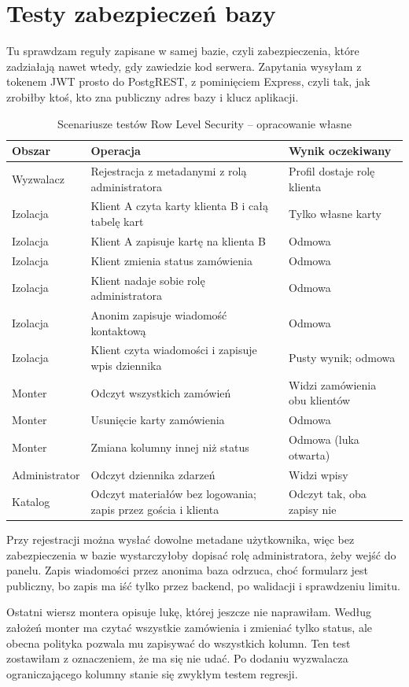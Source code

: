 \section{Testy zabezpieczeń bazy}
\label{sec:testy-rls}

Tu sprawdzam reguły zapisane w samej bazie, czyli zabezpieczenia, które zadziałają nawet wtedy, gdy zawiedzie kod serwera. Zapytania wysyłam z tokenem JWT prosto do PostgREST, z pominięciem Express, czyli tak, jak zrobiłby ktoś, kto zna publiczny adres bazy i klucz aplikacji.

\begin{table}[htbp]
\centering
\caption{Scenariusze testów Row Level Security -- opracowanie własne}
\label{tab:rls}
\begin{tabular}{|p{}|p{}|p{}|}
\hline
\textbf{Obszar} & \textbf{Operacja} & \textbf{Wynik oczekiwany} \\
\hline
Wyzwalacz & Rejestracja z metadanymi z rolą administratora & Profil dostaje rolę klienta \\
\hline
Izolacja & Klient A czyta karty klienta B i całą tabelę kart & Tylko własne karty \\
\hline
Izolacja & Klient A zapisuje kartę na klienta B & Odmowa \\
\hline
Izolacja & Klient zmienia status zamówienia & Odmowa \\
\hline
Izolacja & Klient nadaje sobie rolę administratora & Odmowa \\
\hline
Izolacja & Anonim zapisuje wiadomość kontaktową & Odmowa \\
\hline
Izolacja & Klient czyta wiadomości i zapisuje wpis dziennika & Pusty wynik; odmowa \\
\hline
Monter & Odczyt wszystkich zamówień & Widzi zamówienia obu klientów \\
\hline
Monter & Usunięcie karty zamówienia & Odmowa \\
\hline
Monter & Zmiana kolumny innej niż status & Odmowa (luka otwarta) \\
\hline
Administrator & Odczyt dziennika zdarzeń & Widzi wpisy \\
\hline
Katalog & Odczyt materiałów bez logowania; zapis przez gościa i klienta & Odczyt tak, oba zapisy nie \\
\hline
\end{tabular}
\end{table}

Przy rejestracji można wysłać dowolne metadane użytkownika, więc bez zabezpieczenia w bazie wystarczyłoby dopisać rolę administratora, żeby wejść do panelu. Zapis wiadomości przez anonima baza odrzuca, choć formularz jest publiczny, bo zapis ma iść tylko przez backend, po walidacji i sprawdzeniu limitu.

Ostatni wiersz montera opisuje lukę, której jeszcze nie naprawiłam. Według założeń monter ma czytać wszystkie zamówienia i zmieniać tylko status, ale obecna polityka pozwala mu zapisywać do wszystkich kolumn. Ten test zostawiłam z oznaczeniem, że ma się nie udać. Po dodaniu wyzwalacza ograniczającego kolumny stanie się zwykłym testem regresji.
